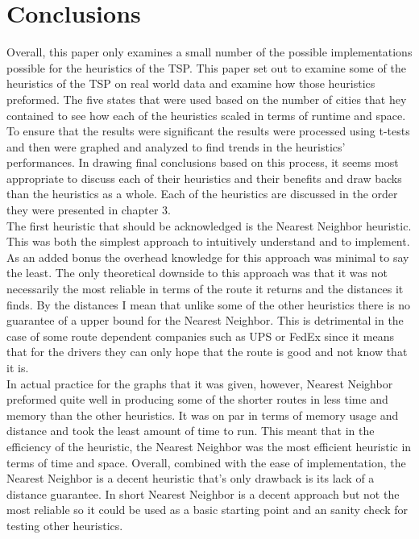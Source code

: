 \documentclass[midd]{thesis}
\newcommand{\tab}{\hspace*{2em}}
\begin{document}
\chapter{Conclusions}
\tab Overall, this paper only examines a small number of the possible implementations possible for the heuristics of the TSP. This paper set out to examine some of the heuristics of the TSP on real world data and examine how those heuristics preformed. The five states that were used based on the number of cities that hey contained to see how each of the heuristics scaled in terms of runtime and space. To ensure that the results were significant the results were processed using t-tests and then were graphed and analyzed to find trends in the heuristics' performances. In drawing final conclusions based on this process, it seems most appropriate to discuss each of their heuristics and their benefits and draw backs than the heuristics as a whole. Each of the heuristics are discussed in the order they were presented in chapter 3.\\
\tab The first heuristic that should be acknowledged is the Nearest Neighbor heuristic. This was both the simplest approach to intuitively understand and to implement. As an added bonus the overhead knowledge for this approach was minimal to say the least. The only theoretical downside to this approach was that it was not necessarily the most reliable in terms of the route it returns and the distances it finds. By the distances I mean that unlike some of the other heuristics there is no guarantee of a upper bound for the Nearest Neighbor. This is detrimental in the case of some route dependent companies such as UPS or FedEx since it means that for the drivers they can only hope that the route is good and not know that it is.\\
\tab In actual practice for the graphs that it was given, however, Nearest Neighbor preformed quite well in producing some of the shorter routes in less time and memory than the other heuristics. It was on par in terms of memory usage and distance and took the least amount of time to run. This meant that in the efficiency of the heuristic, the Nearest Neighbor was the most efficient heuristic in terms of time and space. Overall, combined with the ease of implementation, the Nearest Neighbor is a decent heuristic that's only drawback  is its lack of a distance guarantee. In short Nearest Neighbor is a decent approach but not the most reliable so it could be used as a basic starting point and an sanity check for testing other heuristics.\\
\end{document}
